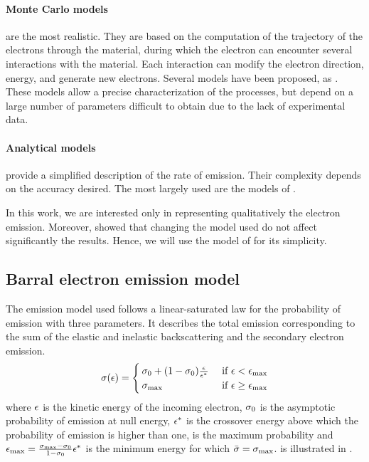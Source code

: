 \paragraph{Monte Carlo models} are the most realistic.
 They are based on the computation of the trajectory of the electrons through the material, during which the electron can encounter several interactions with the material.
 Each interaction can modify the electron direction, energy, and generate new electrons.
 Several models have been proposed, as \citet{furman2002,pierron2017}.
 These models allow a precise characterization of the processes, but depend on a large number of parameters difficult to obtain due to the lack of experimental data.
 
\paragraph{Analytical models} provide a simplified description of the rate of emission.
Their complexity depends on the accuracy desired.
The most largely used are the models of \citet{vaughan1989,barral2003a,sydorenko2006b}.

In this work, we are interested only in representing qualitatively the electron emission.
Moreover, \citet{croes2017} showed that changing the model used do not affect significantly the results. 
Hence, we will use the model of \citet{barral2003a} for its simplicity.

\subsection{Barral electron emission model}
\label{sec-modelused}

The emission model used follows a linear-saturated law for the probability of emission with three parameters. 
It describes the total emission corresponding to the sum of the elastic and inelastic backscattering and the secondary electron emission.
\begin{equation} \label{eq-proba_barral}
  \sigma (\epsilon) = 
  \begin{cases}
    \sigma _0 + (1 - \sigma _0) \frac{\epsilon}{\epsilon^{*}}   &\text{ if } \epsilon <  \epsilon_{\max} \\
    \sigma _{\rm max}  &\text{ if } \epsilon \geq \epsilon_{\max}
  \end{cases}
\end{equation}
where $\epsilon$ is the kinetic energy of the incoming electron, $\sigma _0$ is the asymptotic probability of emission at null energy, $\epsilon^{*}$ is the crossover energy above which the probability of emission is higher than one, \probamax{} is the maximum probability and $\epsilon_{\max}= \frac{\sigma _{\rm max}  - \sigma _0}{1 - \sigma _0} \epsilon^{*} $ is the minimum energy for which $ \bar{\sigma } = \sigma _{\rm max} $.
 is illustrated in .

